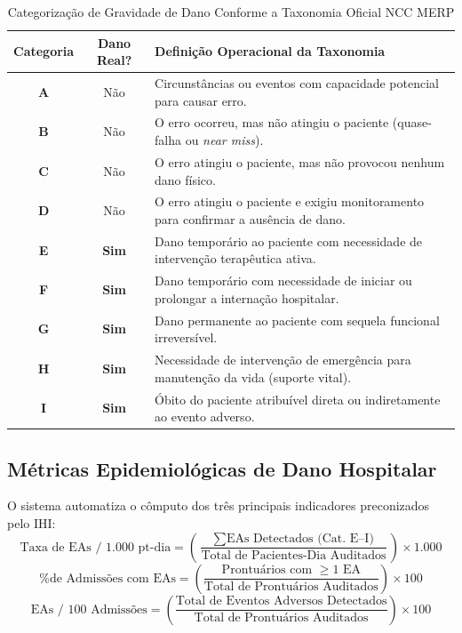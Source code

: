 \begin{table}[htbp]
\centering
\small
\caption{Categorização de Gravidade de Dano Conforme a Taxonomia Oficial NCC MERP}
\label{tab:ncc-merp}
\begin{tabularx}{\textwidth}{c c X}
\toprule
\textbf{Categoria} & \textbf{Dano Real?} & \textbf{Definição Operacional da Taxonomia} \\
\midrule
\textbf{A} & Não & Circunstâncias ou eventos com capacidade potencial para causar erro. \\
\textbf{B} & Não & O erro ocorreu, mas não atingiu o paciente (quase-falha ou \textit{near miss}). \\
\textbf{C} & Não & O erro atingiu o paciente, mas não provocou nenhum dano físico. \\
\textbf{D} & Não & O erro atingiu o paciente e exigiu monitoramento para confirmar a ausência de dano. \\
\textbf{E} & \textbf{Sim} & Dano temporário ao paciente com necessidade de intervenção terapêutica ativa. \\
\textbf{F} & \textbf{Sim} & Dano temporário com necessidade de iniciar ou prolongar a internação hospitalar. \\
\textbf{G} & \textbf{Sim} & Dano permanente ao paciente com sequela funcional irreversível. \\
\textbf{H} & \textbf{Sim} & Necessidade de intervenção de emergência para manutenção da vida (suporte vital). \\
\textbf{I} & \textbf{Sim} & Óbito do paciente atribuível direta ou indiretamente ao evento adverso. \\
\bottomrule
\end{tabularx}
\end{table}

\subsection{Métricas Epidemiológicas de Dano Hospitalar}
O sistema automatiza o cômputo dos três principais indicadores preconizados pelo IHI:
\begin{equation}
    \text{Taxa de EAs / 1.000 pt-dia} = \left( \frac{\sum \text{EAs Detectados (Cat. E--I)}}{\text{Total de Pacientes-Dia Auditados}} \right) \times 1.000
\end{equation}
\begin{equation}
    \text{\% de Admissões com EAs} = \left( \frac{\text{Prontuários com } \ge 1 \text{ EA}}{\text{Total de Prontuários Auditados}} \right) \times 100
\end{equation}
\begin{equation}
    \text{EAs / 100 Admissões} = \left( \frac{\text{Total de Eventos Adversos Detectados}}{\text{Total de Prontuários Auditados}} \right) \times 100
\end{equation}

